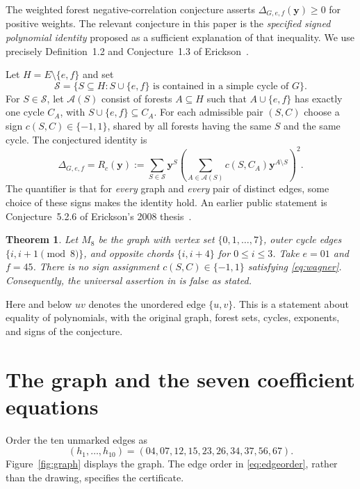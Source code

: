 \documentclass[11pt,a4paper]{article}
\newtheorem{theorem}{Theorem}
\newcommand{\SSS}{\mathcal S}
\newcommand{\Asets}{\mathcal A}
\begin{document}
The weighted forest negative-correlation conjecture asserts
$\Delta_{G,e,f}(\boldsymbol y)\ge0$ for positive weights. The relevant
conjecture in this paper is the \emph{specified signed polynomial
identity} proposed as a sufficient explanation of that inequality.
We use precisely Definition~1.2 and Conjecture~1.3 of
Erickson~\cite{Erickson2012}.

Let $H=E\setminus\{e,f\}$ and set
\[
 \SSS=\{S\subseteq H:S\cup\{e,f\}\text{ is contained in a simple cycle of }G\}.
\]
For $S\in\SSS$, let $\Asets(S)$ consist of forests $A\subseteq H$ such
that $A\cup\{e,f\}$ has exactly one cycle $C_A$, with
$S\cup\{e,f\}\subseteq C_A$. For each admissible pair $(S,C)$ choose
a sign $c(S,C)\in\{-1,1\}$, shared by all forests having the same
$S$ and the same cycle. The conjectured identity is
\begin{equation}\label{eq:wagner}
 \Delta_{G,e,f}
 =R_c(\boldsymbol y):=
 \sum_{S\in\SSS}\boldsymbol y^S
 \left(\sum_{A\in\Asets(S)}c(S,C_A)\boldsymbol y^{A\setminus S}\right)^2.
\end{equation}
The quantifier is that for \emph{every} graph and \emph{every} pair
of distinct edges, some choice of these signs makes the identity hold.
An earlier public statement is Conjecture~5.2.6 of Erickson's
2008 thesis~\cite{Erickson2008}.

\begin{theorem}\label{thm:main}
Let $M_8$ be the graph with vertex set $\{0,1,\ldots,7\}$, outer
cycle edges $\{i,i+1\pmod8\}$, and opposite chords $\{i,i+4\}$
for $0\le i\le3$. Take $e=01$ and $f=45$.
There is no sign assignment $c(S,C)\in\{-1,1\}$ satisfying
\eqref{eq:wagner}. Consequently, the universal assertion in
\cite[Conjecture~1.3]{Erickson2012} is false as stated.
\end{theorem}

Here and below $uv$ denotes the unordered edge $\{u,v\}$. This is a
statement about equality of polynomials, with the original graph,
forest sets, cycles, exponents, and signs of the conjecture.

\section{The graph and the seven coefficient equations}

Order the ten unmarked edges as
\begin{equation}\label{eq:edgeorder}
 (h_1,\ldots,h_{10})=(04,07,12,15,23,26,34,37,56,67).
\end{equation}
Figure~\ref{fig:graph} displays the graph. The edge order in
\eqref{eq:edgeorder}, rather than the drawing, specifies the certificate.
\end{document}
